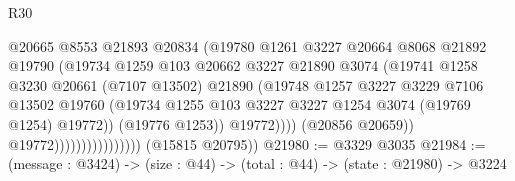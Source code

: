 \begin{lexlean}{R30}
\begin{coremodule}
                                            @20665
                                            @8553
                                            @21893
                                            @20834
                                            (@19780
                                              @1261
                                              @3227
                                              @20664
                                              @8068
                                              @21892
                                              @19790
                                              (@19734
                                                @1259
                                                @103
                                                @20662
                                                @3227
                                                @21890
                                                @3074
                                                (@19741
                                                  @1258
                                                  @3230
                                                  @20661
                                                  (@7107 @13502)
                                                  @21890
                                                  (@19748
                                                    @1257
                                                    @3227
                                                    @3229
                                                    @7106
                                                    @13502
                                                    @19760
                                                    (@19734
                                                      @1255
                                                      @103
                                                      @3227
                                                      @3227
                                                      @1254
                                                      @3074
                                                      (@19769 @1254)
                                                      @19772))
                                                  (@19776 @1253))
                                                @19772))))
                                        (@20856 @20659))
                                      @19772))))))))))))))))
      (@15815 @20795))
@21980 := @3329 @3035
@21984 := (message : @3424) -> (size : @44) -> (total : @44) -> (state : @21980) -> @3224

\end{coremodule}
\end{lexlean}
